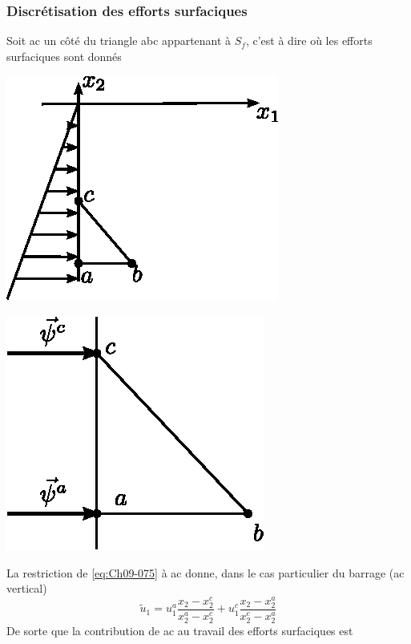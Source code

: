 \subsubsection{Discrétisation des efforts surfaciques}
Soit ac un côté du triangle abc appartenant à $S_f$, c'est à dire où les efforts surfaciques sont donnés
\begin{multicols}{2}
    \begin{center}
        \includegraphics{../images/T1_Ch09-10}
    \end{center}
    \begin{center}
        \includegraphics{../images/T1_Ch09-11}
    \end{center}
\end{multicols}
La restriction de \eqref{eq:Ch09-075} à ac donne, dans le cas particulier du barrage (ac vertical) 
\begin{equation}
    \tilde{u}_1 = u_1^a \frac{x_2 - x_2^c}{x_2^a -x_2^c} + u_1^c \frac{x_2 - x_2^a}{x_2^c -x_2^a}
    \label{eq:Ch09-084}
\end{equation}
De sorte que la contribution de ac au travail des efforts surfaciques est 
